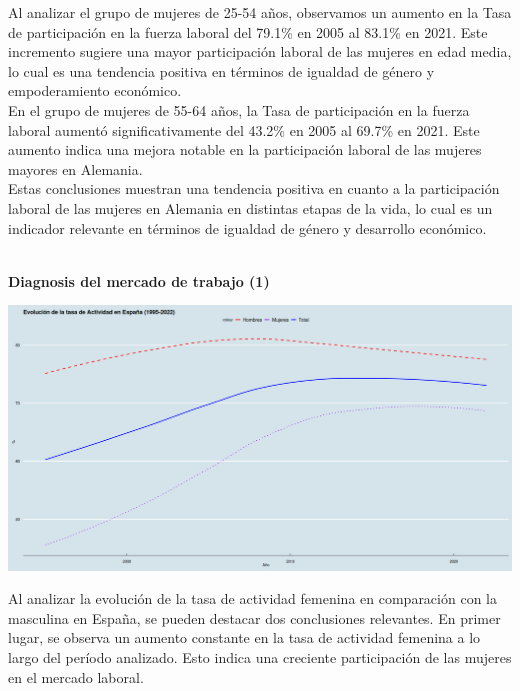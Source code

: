 Al analizar el grupo de mujeres de 25-54 años, observamos un aumento en la Tasa de participación en la fuerza laboral del 79.1\% en 2005 al 83.1\% en 2021. Este incremento sugiere una mayor participación laboral de las mujeres en edad media, lo cual es una tendencia positiva en términos de igualdad de género y empoderamiento económico.\\

En el grupo de mujeres de 55-64 años, la Tasa de participación en la fuerza laboral aumentó significativamente del 43.2\% en 2005 al 69.7\% en 2021. Este aumento indica una mejora notable en la participación laboral de las mujeres mayores en Alemania.\\

Estas conclusiones muestran una tendencia positiva en cuanto a la participación laboral de las mujeres en Alemania en distintas etapas de la vida, lo cual es un indicador relevante en términos de igualdad de género y desarrollo económico.\\\\


\newpage

\textbf{Diagnosis del mercado de trabajo (1)}

    \begin{center}
	\includegraphics[scale=.32]{image/b3ej2e.png}
    \end{center}
    \vspace{.5cm}

    Al analizar la evolución de la tasa de actividad femenina en comparación con la masculina en España, se pueden destacar dos conclusiones relevantes. En primer lugar, se observa un aumento constante en la tasa de actividad femenina a lo largo del período analizado. Esto indica una creciente participación de las mujeres en el mercado laboral.\\

